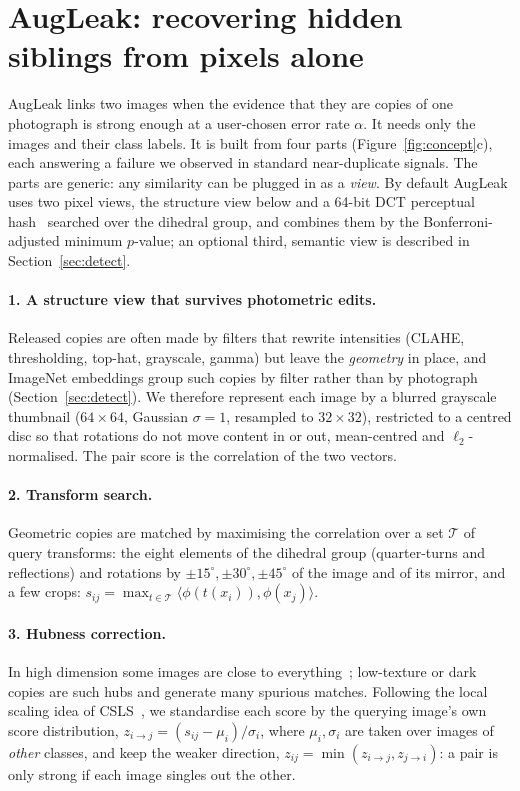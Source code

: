 \section{AugLeak: recovering hidden siblings from pixels alone}
\label{sec:method}

AugLeak links two images when the evidence that they are copies of one photograph is strong enough at a user-chosen error rate $\alpha$. It needs only the images and their class labels. It is built from four parts (Figure~\ref{fig:concept}c), each answering a failure we observed in standard near-duplicate signals. The parts are generic: any similarity can be plugged in as a \emph{view}. By default AugLeak uses two pixel views, the structure view below and a 64-bit DCT perceptual hash~\citep{zauner2010phash} searched over the dihedral group, and combines them by the Bonferroni-adjusted minimum $p$-value; an optional third, semantic view is described in Section~\ref{sec:detect}.

\paragraph{1. A structure view that survives photometric edits.}
Released copies are often made by filters that rewrite intensities (CLAHE, thresholding, top-hat, grayscale, gamma) but leave the \emph{geometry} in place, and ImageNet embeddings group such copies by filter rather than by photograph (Section~\ref{sec:detect}). We therefore represent each image by a blurred grayscale thumbnail ($64\times64$, Gaussian $\sigma=1$, resampled to $32\times32$), restricted to a centred disc so that rotations do not move content in or out, mean-centred and $\ell_2$-normalised. The pair score is the correlation of the two vectors.

\paragraph{2. Transform search.}
Geometric copies are matched by maximising the correlation over a set $\mathcal{T}$ of query transforms: the eight elements of the dihedral group (quarter-turns and reflections) and rotations by $\pm15^\circ,\pm30^\circ,\pm45^\circ$ of the image and of its mirror, and a few crops:
$s_{ij}=\max_{t\in\mathcal{T}}\langle\phi(t(x_i)),\phi(x_j)\rangle$.

\paragraph{3. Hubness correction.}
In high dimension some images are close to everything~\citep{radovanovic2010hubs}; low-texture or dark copies are such hubs and generate many spurious matches. Following the local scaling idea of CSLS~\citep{conneau2018csls}, we standardise each score by the querying image's own score distribution, $z_{i\to j}=(s_{ij}-\mu_i)/\sigma_i$, where $\mu_i,\sigma_i$ are taken over images of \emph{other} classes, and keep the weaker direction, $z_{ij}=\min(z_{i\to j},z_{j\to i})$: a pair is only strong if each image singles out the other.

